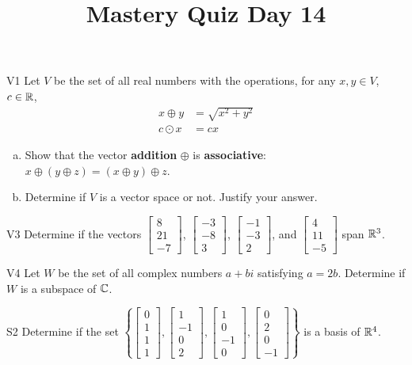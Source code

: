 \documentclass{sbgLAquiz}
\title{Mastery Quiz Day 14 }
\begin{document}
\begin{problem}{V1}
Let $V$ be the set of all real numbers with the operations, for any $x, y \in V$, $c \in \mathbb{R}$,
\begin{align*}
x \oplus y &= \sqrt{x^2+y^2} \\
c \odot x &= c x
\end{align*}
\begin{enumerate}[(a)]
\item Show that the vector \textbf{addition} $\oplus$ is \textbf{associative}:
      \(x \oplus (y \oplus z)=(x\oplus y)\oplus z\).
\item Determine if $V$ is a vector space or not.  Justify your answer.
\end{enumerate}
\end{problem}

\begin{problem}{V3}
Determine if the vectors  $\begin{bmatrix} 8 \\ 21 \\ -7 \end{bmatrix}$, $\begin{bmatrix} -3 \\ -8 \\ 3 \end{bmatrix}$, $\begin{bmatrix} -1 \\ -3 \\ 2 \end{bmatrix}$, and $\begin{bmatrix} 4 \\ 11 \\ -5 \end{bmatrix}$ span $\mathbb{R}^3$.
\end{problem}
\newpage

\begin{problem}{V4} Let \(W\) be the set of all complex numbers \(a+bi\)
satisfying  \(a=2b\).
Determine if \(W\) is a subspace of \(\mathbb{C}\).
\end{problem}

\begin{problem}{S2}
Determine if the set $\left\{ \begin{bmatrix} 0 \\ 1 \\ 1 \\ 1 \end{bmatrix}, \begin{bmatrix} 1 \\ -1 \\ 0 \\ 2 \end{bmatrix}, \begin{bmatrix} 1 \\ 0 \\ -1 \\ 0 \end{bmatrix}, \begin{bmatrix}0 \\ 2 \\ 0 \\ -1 \end{bmatrix} \right\}$ is a basis of $\mathbb{R}^4$.
\end{problem}
\end{document}
